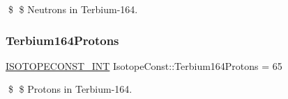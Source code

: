 \$ \$ Neutrons in Terbium-\/164. \mbox{\label{group___isotope_const-_terbium-_tb164_ga6187e42939afd55b7e2ddd113ec4407d}} 
\subsubsection{\texorpdfstring{Terbium164\+Protons}{Terbium164Protons}}
{\footnotesize\ttfamily \mbox{\hyperlink{group___isotope_const-_macros_ga5f18360b3e99483a35c32d789e62621c}{I\+S\+O\+T\+O\+P\+E\+C\+O\+N\+S\+T\+\_\+\+I\+NT}} Isotope\+Const\+::\+Terbium164\+Protons = 65}

\$ \$ Protons in Terbium-\/164. 